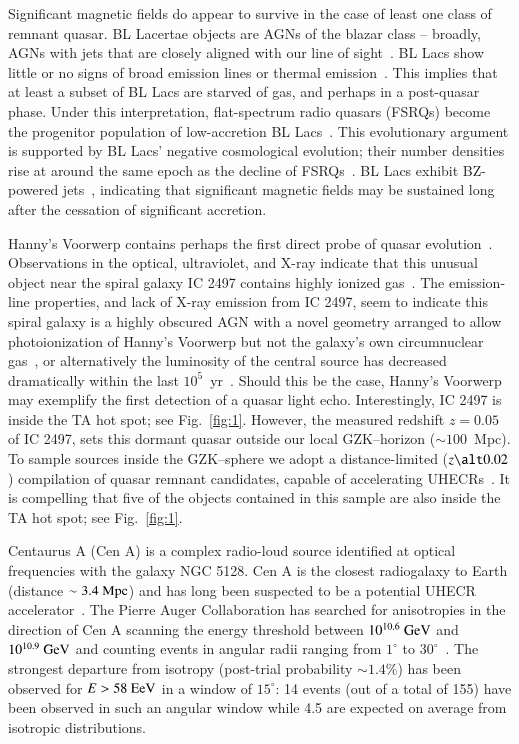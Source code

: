 \documentclass[aps,prd,twocolumn,superscriptaddress,tightenlines,nofootinbib]{revtex4-1}
\begin{document}
Significant magnetic fields do appear to survive in the case of least
one class of remnant quasar. BL Lacertae objects are AGNs of the
blazar class -- broadly, AGNs with jets that are closely aligned with our
line of sight~\cite{Urry:1995mg,Blandford:1978}. BL Lacs show little
or no signs of broad emission lines or thermal
emission~\cite{Urry:1995mg,Marcha,Giommi:2011sn}. This implies that at
least a subset of BL Lacs are starved of gas, and perhaps in a
post-quasar phase. Under this interpretation, flat-spectrum radio
quasars (FSRQs) become the progenitor population of low-accretion BL
Lacs~\cite{Cavaliere:2001gb,Boettcher:2001jp,Ajello:2011zi}. This evolutionary argument is supported by BL Lacs'
negative cosmological evolution; their number densities rise at around
the same epoch as the decline of FSRQs~\cite{Ajello:2013lka}. BL Lacs
exhibit BZ-powered jets~\cite{Maraschi:2002pp}, indicating that
significant magnetic fields may be sustained long after the cessation
of significant accretion.


Hanny's Voorwerp contains perhaps the first direct probe of
quasar  evolution~\cite{Lintott:2009wq}. Observations in the
optical, ultraviolet, and X-ray indicate that this unusual object near
the spiral galaxy IC 2497 contains highly ionized gas~\cite{Jozsa:2009qm}. The
emission-line properties, and lack of X-ray emission from IC 2497,
seem to indicate this spiral galaxy is a highly obscured AGN with a
novel geometry arranged to allow photoionization of Hanny's Voorwerp
but not the galaxy's own circumnuclear gas~\cite{Rampadarath:2010yv}, or alternatively the
luminosity of the central source has decreased dramatically within the
last $10^5$~yr~\cite{Schawinski:2010up}. Should this be the case, Hanny's Voorwerp may
exemplify the first detection of a quasar light echo. Interestingly,
IC 2497 is inside the TA hot spot; see Fig.~\ref{fig:1}. 
However, the measured redshift $z =0.05$ of IC 2497, sets this dormant quasar outside our local GZK--horizon ($\sim
100$~Mpc). To sample sources inside the GZK--sphere we adopt a
distance-limited ($z \alt
0.02$) compilation of quasar remnant candidates, capable of
accelerating UHECRs~\cite{Torres:2002bb,Isola:2003jk}. It is compelling that five of
the objects contained in this sample are also inside the TA hot spot; see Fig.~\ref{fig:1}.

Centaurus A (Cen A) is a complex radio-loud source
  identified at optical frequencies with the galaxy NGC 5128. Cen A is
  the closest radiogalaxy to Earth (distance $\sim 3.4~{\rm Mpc}$) and has long
been suspected to be a potential UHECR
accelerator~\cite{Cavallo:1978,Romero:1995tn}. The Pierre Auger
Collaboration has searched for anisotropies in the direction of Cen A
scanning the energy threshold between $10^{10.6}~{\rm GeV}$ and
$10^{10.9}~{\rm GeV}$ and counting events in angular radii ranging
from $1^\circ$ to $30^\circ$~\cite{PierreAuger:2014yba}.  The
strongest departure from isotropy (post-trial probability $\sim
1.4\%$) has been observed for $E > 58~{\rm EeV}$ in a window of
$15^\circ$: 14 events (out of a total of 155) have been observed in
such an angular window while 4.5 are expected on average from
isotropic distributions.
\end{document}
